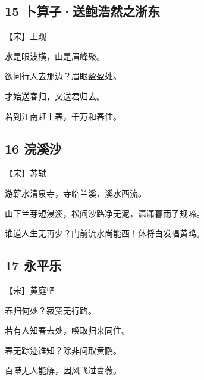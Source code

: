 \documentclass[a6paper, 12pt]{article}
\begin{document}
\subsection*{15 卜算子·送鲍浩然之浙东}

【宋】王观

水是眼波横，山是眉峰聚。

欲问行人去那边？眉眼盈盈处。

才始送春归，又送君归去。

若到江南赶上春，千万和春住。

\subsection*{16 浣溪沙}

【宋】苏轼

游蕲水清泉寺，寺临兰溪，溪水西流。

山下兰芽短浸溪，松间沙路净无泥，潇潇暮雨子规啼。

谁道人生无再少？门前流水尚能西！休将白发唱黄鸡。

\subsection*{17 永平乐}

【宋】黄庭坚

春归何处？寂寞无行路。

若有人知春去处，唤取归来同住。

春无踪迹谁知？除非问取黄鹂。

百啭无人能解，因风飞过蔷薇。
\end{document}
